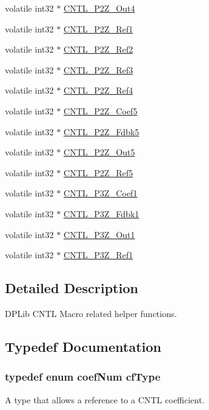 \begin{DoxyCompactItemize}
volatile int32 $\ast$ \hyperlink{a00014_a253e4070b19470606e0566ff25fc911f}{C\-N\-T\-L\-\_\-P2\-Z\-\_\-\-Out4}
\item 
volatile int32 $\ast$ \hyperlink{a00014_a98527ce76f5175fa2933d46f324d85fb}{C\-N\-T\-L\-\_\-P2\-Z\-\_\-\-Ref1}
\item 
volatile int32 $\ast$ \hyperlink{a00014_a9bf1756a901a3a74d9f43a51f85cede4}{C\-N\-T\-L\-\_\-P2\-Z\-\_\-\-Ref2}
\item 
volatile int32 $\ast$ \hyperlink{a00014_a859e9bbd5bc82f1b42863a93e4f992af}{C\-N\-T\-L\-\_\-P2\-Z\-\_\-\-Ref3}
\item 
volatile int32 $\ast$ \hyperlink{a00014_af54c55f228deb8189c44282a94a870c1}{C\-N\-T\-L\-\_\-P2\-Z\-\_\-\-Ref4}
\item 
volatile int32 $\ast$ \hyperlink{a00014_a5fe3f4dd6aac27512c9e0b6fc843b0b6}{C\-N\-T\-L\-\_\-P2\-Z\-\_\-\-Coef5}
\item 
volatile int32 $\ast$ \hyperlink{a00014_af5cbb635f31bbebd041e8543deb40dee}{C\-N\-T\-L\-\_\-P2\-Z\-\_\-\-Fdbk5}
\item 
volatile int32 $\ast$ \hyperlink{a00014_a3b336a91d25a7feb9f8927b32b800d0d}{C\-N\-T\-L\-\_\-P2\-Z\-\_\-\-Out5}
\item 
volatile int32 $\ast$ \hyperlink{a00014_abd3b240e2d3f7d3f4f717066ee8efd3e}{C\-N\-T\-L\-\_\-P2\-Z\-\_\-\-Ref5}
\item 
volatile int32 $\ast$ \hyperlink{a00014_a41005c53e7c439f0af28e140f7d3d0ed}{C\-N\-T\-L\-\_\-P3\-Z\-\_\-\-Coef1}
\item 
volatile int32 $\ast$ \hyperlink{a00014_a361372a23d9146cd2d077e6c843ec47e}{C\-N\-T\-L\-\_\-P3\-Z\-\_\-\-Fdbk1}
\item 
volatile int32 $\ast$ \hyperlink{a00014_acb0edbb1cfd2fb0e63ac2eb233dcd577}{C\-N\-T\-L\-\_\-P3\-Z\-\_\-\-Out1}
\item 
volatile int32 $\ast$ \hyperlink{a00014_a6ebe91dab023eff56cade0eddcd3e96d}{C\-N\-T\-L\-\_\-P3\-Z\-\_\-\-Ref1}
\end{DoxyCompactItemize}


\subsection{Detailed Description}
D\-P\-Lib C\-N\-T\-L Macro related helper functions. 

\subsection{Typedef Documentation}
\hypertarget{a00014_ac340fbbc5919954c173757935549588f}{
\subsubsection[{cf\-Type}]{\setlength{\rightskip}{0pt plus 5cm}typedef enum {\bf coef\-Num} {\bf cf\-Type}}}\label{a00014_ac340fbbc5919954c173757935549588f}
A type that allows a reference to a C\-N\-T\-L coefficient. 

